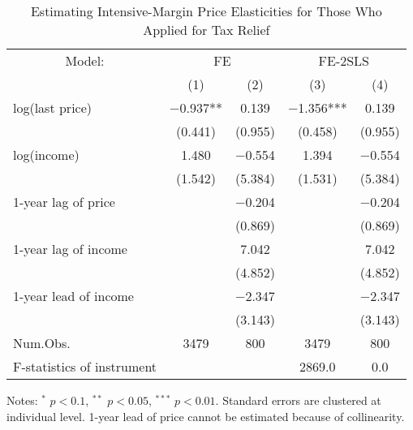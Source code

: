 \begin{table}

\caption{Estimating Intensive-Margin Price Elasticities for Those Who Applied for Tax Relief \label{teb:intensive-r1}}
\centering
\begin{threeparttable}
\begin{tabular}[t]{lcccc}
\toprule
\multicolumn{1}{c}{Model:} & \multicolumn{2}{c}{FE} & \multicolumn{2}{c}{FE-2SLS} \\
\cmidrule(l{3pt}r{3pt}){1-1} \cmidrule(l{3pt}r{3pt}){2-3} \cmidrule(l{3pt}r{3pt}){4-5}
  & (1) & (2) & (3) & (4)\\
\midrule
log(last price) & \num{-0.937}** & \num{0.139} & \num{-1.356}*** & \num{0.139}\\
 & (\num{0.441}) & (\num{0.955}) & (\num{0.458}) & (\num{0.955})\\
log(income) & \num{1.480} & \num{-0.554} & \num{1.394} & \num{-0.554}\\
 & (\num{1.542}) & (\num{5.384}) & (\num{1.531}) & (\num{5.384})\\
1-year lag of price &  & \num{-0.204} &  & \num{-0.204}\\
 &  & (\num{0.869}) &  & (\num{0.869})\\
1-year lag of income &  & \num{7.042} &  & \num{7.042}\\
 &  & (\num{4.852}) &  & (\num{4.852})\\
1-year lead of income &  & \num{-2.347} &  & \num{-2.347}\\
 &  & (\num{3.143}) &  & (\num{3.143})\\
\midrule
Num.Obs. & \num{3479} & \num{800} & \num{3479} & \num{800}\\
F-statistics of instrument &  &  & 2869.0 & 0.0\\
\bottomrule
\end{tabular}
\begin{tablenotes}
\item Notes: $^{*}$ $p < 0.1$, $^{**}$ $p < 0.05$, $^{***}$ $p < 0.01$. Standard errors are clustered at individual level. 1-year lead of price cannot be estimated because of collinearity.
\end{tablenotes}
\end{threeparttable}
\end{table}
